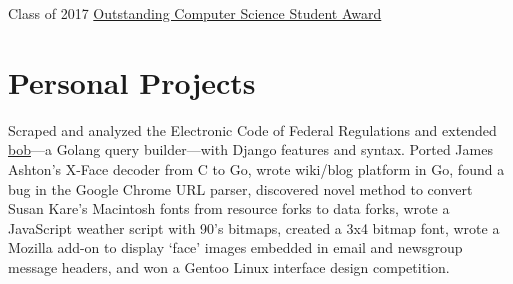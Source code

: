 \documentclass[]{article}
\newcommand\VRule{\color{lightgray}\vrule width 0.5pt}
\begin{document}
Class of 2017 \href{https://www.gettysburg.edu/academic-programs/computer-science/programs/honors-programs}{Outstanding Computer Science Student Award}




\section*{Personal Projects}
Scraped and analyzed the Electronic Code of Federal Regulations and extended \href{https://github.com/stephenafamo/bob}{bob}—a Golang query builder—with Django features and syntax. Ported James Ashton’s X-Face decoder from C to Go, wrote wiki/blog platform in Go, found a bug in the Google Chrome URL parser, discovered novel method to convert Susan Kare's Macintosh fonts from resource forks to data forks, wrote a JavaScript weather script with 90's bitmaps, created a 3x4 bitmap font, wrote a Mozilla add-on to display ‘face’ images embedded in email and newsgroup message headers, and won a Gentoo Linux interface design competition. 

\end{document}
